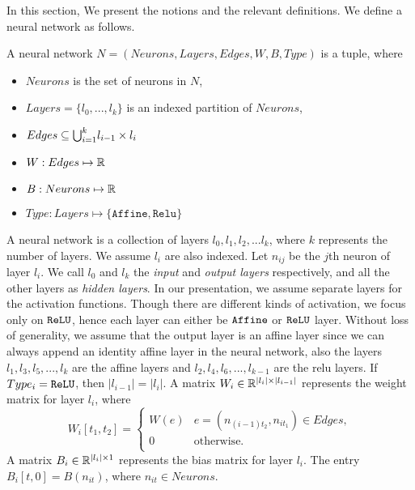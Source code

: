 In this section, We present the notions and the relevant definitions.
We define a neural network as follows. %

\begin{df}
  \label{def:net}
    A neural network $N = (Neurons, Layers, Edges, W, B, Type)$ is a tuple, where
    \begin{itemize}
        \item $Neurons$ is the set of neurons in $N$,
        \item $Layers = \{l_0,...,l_k\}$ is an indexed partition of $Neurons$,
        \item $ Edges \subseteq {\bigcup}_{i=1}^{k} l_{i-1} \times l_{i}$
        \item $W : Edges \mapsto \mathbb{R}$
        \item $B : Neurons \mapsto \mathbb{R}$
        \item $Type : Layers \mapsto \{\mathtt{Affine}, \mathtt{Relu}\}$
    \end{itemize}
\end{df}

A neural network is a collection of layers $l_0, l_1, l_2, ... l_k$, where $k$ represents
the number of layers.
We assume $l_i$ are also indexed.
% 
Let $n_{ij}$ be the $j$th neuron of layer $l_i$.
%
We call $l_0$ and $l_k$ the {\em input} and {\em output layers} respectively, and all
the other layers as {\em hidden layers}.
%
In our presentation, we assume separate layers for the activation functions.
%
Though there are different kinds of
activation, we focus only on $\mathtt{ReLU}${}, hence each layer can either be  $\mathtt{Affine}${} or $\mathtt{ReLU}${} layer.
%
Without loss of generality, we assume that the output layer is an affine layer 
since we can always append an identity affine layer in the neural network, also
the layers $l_1, l_3, l_5, ..., l_k$ 
are the affine layers and $l_2, l_4, l_6, ..., l_{k-1}$ are the relu layers.  
%
If $Type_i = \mathtt{ReLU}$, then $|l_{i-1}| = |l_{i}|$.
A matrix $W_i \in \mathbb{R}^{|l_i|\times|l_{i-1}|}$ represents the weight matrix for layer $l_i$, where
$$
W_i[t_1, t_2] = 
\begin{cases}
  W(e) & e=(n_{(i-1)t_2}, n_{it_1}) \in Edges,\\
  0 & \text{otherwise.}\\
\end{cases}
$$
A matrix $B_i \in \mathbb{R}^{|l_i|\times 1}$ represents the bias matrix for layer $l_i$. The entry $B_i[t,0] = B(n_{it})$, where $n_{it} \in Neurons$. 

